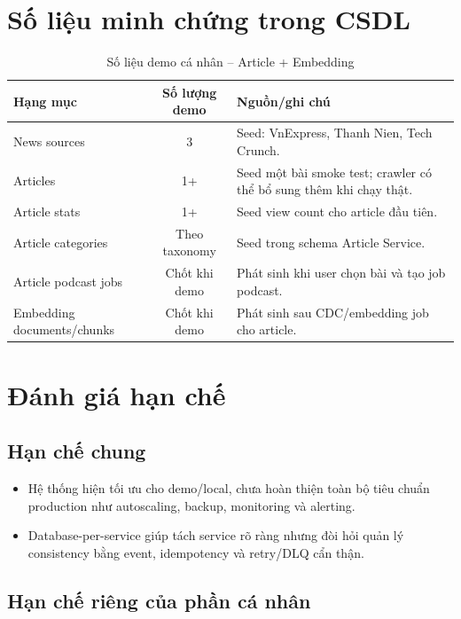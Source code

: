 \documentclass[14pt,a4paper,oneside]{extreport}
\begin{document}
\section{Số liệu minh chứng trong CSDL}
\label{sec:so-lieu-minh-chung}

\begin{table}[H]
\centering
\caption{Số liệu demo cá nhân -- Article + Embedding}
\label{tab:so-lieu-demo}
\renewcommand{\arraystretch}{1.3}
\small
\begin{tabularx}{\textwidth}{|l|c|X|}
\hline
\textbf{Hạng mục} & \textbf{Số lượng demo} & \textbf{Nguồn/ghi chú} \\
\hline
News sources & 3 & Seed: VnExpress, Thanh Nien, Tech Crunch. \\
\hline
Articles & 1+ & Seed một bài smoke test; crawler có thể bổ sung thêm khi chạy thật. \\
\hline
Article stats & 1+ & Seed view count cho article đầu tiên. \\
\hline
Article categories & Theo taxonomy & Seed trong schema Article Service. \\
\hline
Article podcast jobs & Chốt khi demo & Phát sinh khi user chọn bài và tạo job podcast. \\
\hline
Embedding documents/chunks & Chốt khi demo & Phát sinh sau CDC/embedding job cho article. \\
\hline
\end{tabularx}
\end{table}

\section{Đánh giá hạn chế}
\label{sec:han-che}

\subsection{Hạn chế chung}

\begin{itemize}[leftmargin=2cm]
  \item Hệ thống hiện tối ưu cho demo/local, chưa hoàn thiện toàn bộ tiêu chuẩn production như autoscaling, backup, monitoring và alerting.
  \item Database-per-service giúp tách service rõ ràng nhưng đòi hỏi quản lý consistency bằng event, idempotency và retry/DLQ cẩn thận.
\end{itemize}

\subsection{Hạn chế riêng của phần cá nhân}
\end{document}
